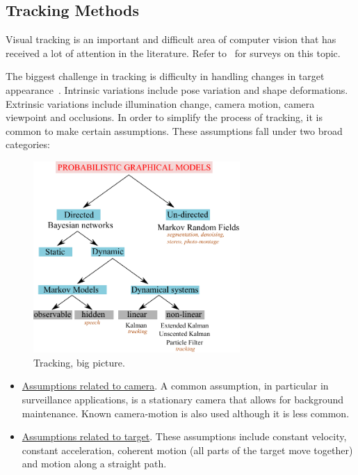 


\begin{FrontMatter}
\contents %
\end{FrontMatter}
\begin{Body}

\chapter{Tracking Methods}
\label{chap_TRK}	
Visual tracking is an important and difficult area of computer vision that has received a lot of attention in the literature.  Refer to~\cite{2006_JNL_SURVEYtrk_Trucco, 2006_JNL_SURVEYtrk_Yilmaz, 2008_REP_SURVEYtrk_Cannons} for surveys on this topic.

The biggest challenge in tracking is difficulty in handling changes in target appearance~\cite{2008_JNL_subspaceTRK_Ross}.  Intrinsic variations include pose variation and shape deformations.  Extrinsic variations include illumination change, camera motion, camera viewpoint and occlusions.  In order to simplify the process of tracking, it is common to make certain assumptions.  These assumptions fall under two broad categories:


								\begin{figure}[t]
								\center
								\includegraphics[width=0.7\textwidth]{thesis/PRML_PGM_overview.pdf}
								\caption{Tracking, big picture.}
								\label{fig:TRK_big_picture}
								\end{figure}


\begin{itemize}
\item \underline{Assumptions related to camera}.  A common assumption, in particular in surveillance applications, is a stationary camera that allows for background maintenance.  Known camera-motion is also used although it is less common.
\item \underline{Assumptions related to target}.  These assumptions include constant velocity, constant acceleration, coherent motion (all parts of the target move together) and motion along a straight path.
\end{itemize}


\end{Body}
